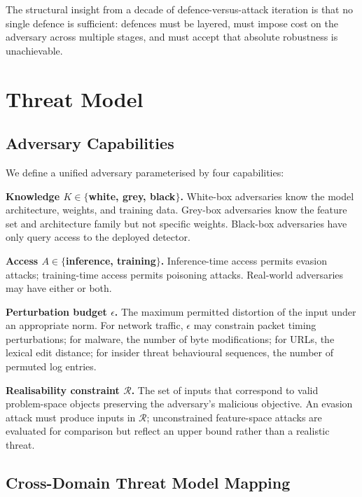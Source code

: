 \documentclass[sigconf,nonacm]{acmart}
\begin{document}
The structural insight from a decade of defence-versus-attack iteration is
that no single defence is sufficient: defences must be layered, must impose
cost on the adversary across multiple stages, and must accept that absolute
robustness is unachievable.

\section{Threat Model}
\label{sec:threat}

\subsection{Adversary Capabilities}

We define a unified adversary parameterised by four capabilities:

\textbf{Knowledge $K \in \{$white, grey, black$\}$.} White-box adversaries know
the model architecture, weights, and training data. Grey-box adversaries know
the feature set and architecture family but not specific weights. Black-box
adversaries have only query access to the deployed detector.

\textbf{Access $A \in \{$inference, training$\}$.} Inference-time access permits
evasion attacks; training-time access permits poisoning attacks. Real-world
adversaries may have either or both.

\textbf{Perturbation budget $\epsilon$.} The maximum permitted distortion of
the input under an appropriate norm. For network traffic, $\epsilon$ may
constrain packet timing perturbations; for malware, the number of byte
modifications; for URLs, the lexical edit distance; for insider threat
behavioural sequences, the number of permuted log entries.

\textbf{Realisability constraint $\mathcal{R}$.} The set of inputs that
correspond to valid problem-space objects preserving the adversary's
malicious objective. An evasion attack must produce inputs in $\mathcal{R}$;
unconstrained feature-space attacks are evaluated for comparison but reflect
an upper bound rather than a realistic threat.

\subsection{Cross-Domain Threat Model Mapping}
\end{document}
